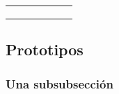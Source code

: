 \begin{table}[h]
\begin{tabular}{clcllc}
                                                                  &                                                                                   &                          & \multicolumn{2}{l}{}                                                                                                                                                                                                                                                                                            &                                                                                                                          \\
                                                                  &                                                                                   &                          & \multicolumn{2}{l}{}                                                                                                                                                                                                                                                                                            &                                                                                                                          \\
\multicolumn{1}{l}{}                                              &                                                                                   & \multicolumn{1}{l}{}     &                                                                                                                                                        &                                                                                                                                                        & \multicolumn{1}{l}{}                                                                                                    
\\
\bottomrule
\hline                                                                        
\end{tabular}
\label{tab:Ensayo2B}
\end{table}


\subsection{Prototipos}

\subsubsection{Una subsubsección}

